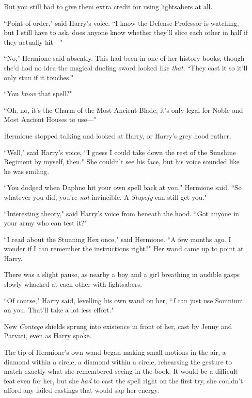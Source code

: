 But you still had to give them extra credit for using lightsabers at all.

``Point of order," said Harry's voice. ``I know the Defense Professor is watching, but I still have to ask, does anyone know whether they'll slice each other in half if they actually hit—"

``No," Hermione said absently. This had been in one of her history books, though she'd had no idea the magical dueling sword looked like \emph{that}. ``They cast it so it'll only stun if it touches."

``You \emph{know} that spell?"

``Oh, no, it's the Charm of the Most Ancient Blade, it's only legal for Noble and Most Ancient Houses to use—"

Hermione stopped talking and looked at Harry, or Harry's grey hood rather.

``Well," said Harry's voice, ``I guess I could take down the rest of the Sunshine Regiment by myself, then." She couldn't see his face, but his voice sounded like he was smiling.

``You dodged when Daphne hit your own spell back at you," Hermione said. ``So whatever you did, you're \emph{not} invincible. A \emph{Stupefy} can still get you."

``Interesting theory," said Harry's voice from beneath the hood. ``Got anyone in your army who can test it?"

``I read about the Stunning Hex once," said Hermione. ``A few months ago. I wonder if I can remember the instructions right?" Her wand came up to point at Harry.

There was a slight pause, as nearby a boy and a girl breathing in audible gasps slowly whacked at each other with lightsabers.

``Of course," Harry said, levelling his own wand on her, ``\emph{I} can just use Somnium on you. That'll take a lot less effort."

New \emph{Contego} shields sprung into existence in front of her, cast by Jenny and Parvati, even as Harry spoke.

The tip of Hermione's own wand began making small motions in the air, a diamond within a circle, a diamond within a circle, rehearsing the gesture to match exactly what she remembered seeing in the book. It would be a difficult feat even for her, but she \emph{had} to cast the spell right on the first try, she couldn't afford any failed castings that would sap her energy.

